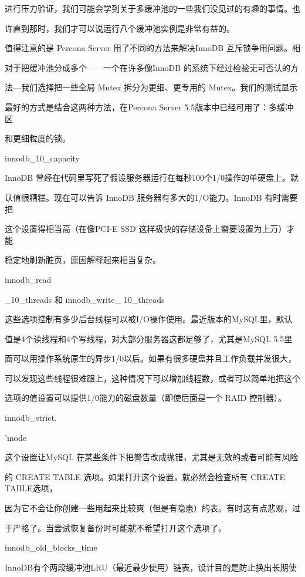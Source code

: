 进行压力验证，我们可能会学到关于多缓冲池的一些我们没见过的有趣的事情。也

许直到那时，我们才可以说运行八个缓冲池实例是非常有益的。

值得注意的是 Percona Server 用了不同的方法来解决InnoDB 互斥锁争用问题。相

对于把缓冲池分成多个——一个在许多像InnoDB 的系统下经过检验无可否认的方

法—我们选择把一些全局 Mutex 拆分为更细、更专用的 Mutex。我们的测试显示

最好的方式是结合这两种方法，在Percona Server 5.5版本中已经可用了：多缓冲区

和更细粒度的锁。

innodb\_10\_capacity

InnoDB 曾经在代码里写死了假设服务器运行在每秒100个1/0操作的单硬盘上。默

认值很糟糕。现在可以告诉 InnoDB 服务器有多大的1/O能力。InnoDB 有时需要把

这个设置得相当高（在像PCI-E SSD 这样极快的存储设备上需要设置为上万）才能

稳定地刷新脏页，原因解释起来相当复杂。

innodb\_read

\_10\_threads 和 innodb\_write\_ 10\_threads

这些选项控制有多少后台线程可以被I/O操作使用。最近版本的MySQL里，默认

值是4个读线程和4个写线程，对大部分服务器这都足够了，尤其是MySQL 5.5里

面可以用操作系统原生的异步1/0以后。如果有很多硬盘并且工作负载并发很大，

可以发现这些线程很难跟上，这种情况下可以增加线程数，或者可以简单地把这个

选项的值设置可以提供1/0能力的磁盘数量（即使后面是一个 RAID 控制器）。

innodb\_strict.

'mode

这个设置让MySQL 在某些条件下把警告改成抛错，尤其是无效的或者可能有风险

的 CREATE TABLE 选项。如果打开这个设置，就必然会检查所有 CREATE TABLE选项，

因为它不会让你创建一些用起来比较爽（但是有隐患）的表。有时这有点悲观，过

于严格了。当尝试恢复备份时可能就不希望打开这个选项了。

innodb\_old\_blocks\_time

InnoDB有个两段缓冲池LRU（最近最少使用）链表，设计目的是防止换出长期使

